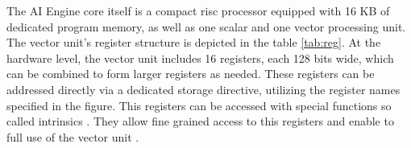The AI Engine core itself is a compact \ac{risc} processor equipped with 16 KB of dedicated program memory, as well as one scalar and one vector processing unit. The vector unit's register structure is depicted in the table \ref{tab:reg}. At the hardware level, the vector unit includes 16 registers, each 128 bits wide, which can be combined to form larger registers as needed. These registers can be addressed directly via a dedicated storage directive, utilizing the register names specified in the figure. This registers can be accessed with special functions so called intrinsics . They allow fine grained access to this registers and enable to full use of the vector unit \cite{AMD_aie_intrinsics, AMD_a_aie_s}.\par

\begin{table}
\centering
{}
\end{table}
